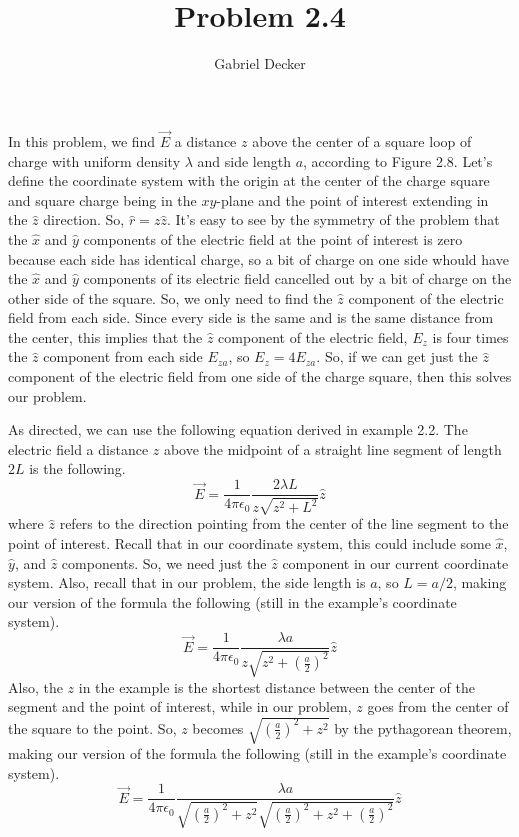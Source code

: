 \documentclass[12pt]{article}
\title{Problem 2.4}
\author{Gabriel Decker}
\begin{document}
\maketitle
\begin{flushleft}


In this problem, we find $\vec{E}$ a distance $z$ above the center of a square loop of charge with uniform density $\lambda$ and side length $a$, according to Figure 2.8.
Let's define the coordinate system with the origin at the center of the charge square and square charge being in the $xy$-plane and the point of interest extending in the $\hat{z}$ direction.
So, $\hat{r}=z\hat{z}$.
It's easy to see by the symmetry of the problem that the $\hat{x}$ and $\hat{y}$ components of the electric field at the point of interest is zero because each side has identical charge, so a bit of charge on one side whould have the $\hat{x}$ and $\hat{y}$ components of its electric field cancelled out by a bit of charge on the other side of the square.
So, we only need to find the $\hat{z}$ component of the electric field from each side.
Since every side is the same and is the same distance from the center, this implies that the $\hat{z}$ component of the electric field, $E_z$ is four times the $\hat{z}$ component from each side $E_{za}$, so $E_z=4E_{za}$.
So, if we can get just the $\hat{z}$ component of the electric field from one side of the charge square, then this solves our problem.

As directed, we can use the following equation derived in example 2.2.
The electric field a distance $z$ above the midpoint of a straight line segment of length $2L$ is the following.
$$\vec{E}=\frac{1}{4\pi\epsilon_0}\frac{2\lambda L}{z\sqrt{z^2+L^2}}\hat{z}$$
where $\hat{z}$ refers to the direction pointing from the center of the line segment to the point of interest.
Recall that in our coordinate system, this could include some $\hat{x}$, $\hat{y}$, and $\hat{z}$ components.
So, we need just the $\hat{z}$ component in our current coordinate system.
Also, recall that in our problem, the side length is $a$, so $L=a/2$, making our version of the formula the following (still in the example's coordinate system).
$$\vec{E}=\frac{1}{4\pi\epsilon_0}\frac{\lambda a}{z\sqrt{z^2+(\frac{a}{2})^2}}\hat{z}$$
Also, the $z$ in the example is the shortest distance between the center of the segment and the point of interest, while in our problem, $z$ goes from the center of the square to the point.
So, $z$ becomes $\sqrt{(\frac{a}{2})^2+z^2}$ by the pythagorean theorem, making our version of the formula the following (still in the example's coordinate system).
$$\vec{E}=\frac{1}{4\pi\epsilon_0}\frac{\lambda a}{\sqrt{(\frac{a}{2})^2+z^2}\sqrt{(\frac{a}{2})^2+z^2+(\frac{a}{2})^2}}\hat{z}$$\\~\\


\end{flushleft}
\end{document}
